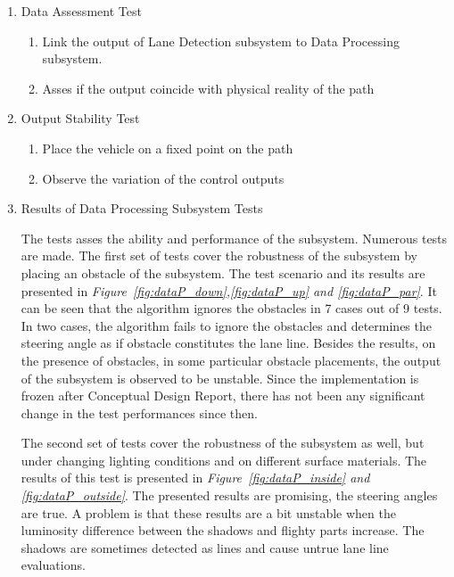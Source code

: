 \documentclass[a4paper,12pt]{article}
\begin{document}
\begin{enumerate}

\item Data Assessment Test

\begin{enumerate}

\item Link the output of Lane Detection subsystem to Data Processing subsystem.  

\item Asses if the output coincide with physical reality of the path  

\end{enumerate}

\item Output Stability Test

\begin{enumerate}
	
	\item Place the vehicle on a fixed point on the path
	
	\item Observe the variation of the control outputs
	
\end{enumerate}

\item{Results of Data Processing Subsystem Tests}\label{sec:DataProcessingSubsystemTests}

	The tests asses the ability and performance of the subsystem. Numerous tests are made. The first set of tests cover the robustness of the subsystem by placing an obstacle of the subsystem. The test scenario and its results are presented in \textit{Figure~\ref{fig:dataP_down},\ref{fig:dataP_up} and \ref{fig:dataP_par}}. It can be seen that the algorithm ignores the obstacles in 7 cases out of 9 tests. In two cases, the algorithm fails to ignore the obstacles and determines the steering angle as if obstacle constitutes the lane line. Besides the results, on the presence of obstacles, in some particular obstacle placements, the output of the subsystem is observed to be unstable. Since the implementation is frozen after Conceptual Design Report, there has not been any significant change in the test performances since then.

	The second set of tests cover the robustness of the subsystem as well, but under changing lighting conditions and on different surface materials. The results of this test is presented in \textit{Figure~\ref{fig:dataP_inside} and \ref{fig:dataP_outside}}. The presented results are promising, the steering angles are true. A problem is that these results are a bit unstable when the luminosity difference between the shadows and flighty parts increase. The shadows are sometimes detected as lines and cause untrue lane line evaluations.	
	

\end{enumerate}
\end{document}
